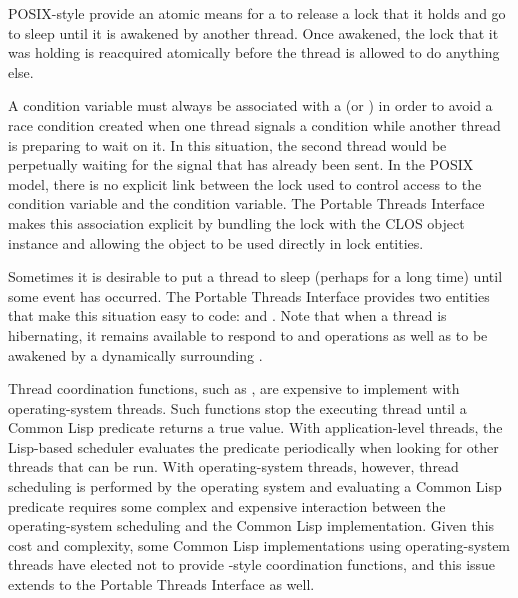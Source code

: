 
POSIX-style  provide an atomic means for a
 to release a lock that it holds and go to sleep until it is
awakened by another thread.  Once awakened, the lock that it was holding is
reacquired atomically before the thread is allowed to do anything else.

A condition variable must always be associated with a  (or
) in order to avoid a race condition created when one
thread signals a condition while another thread is preparing to wait on it.
In this situation, the second thread would be perpetually waiting for the
signal that has already been sent.  In the POSIX model, there is no explicit
link between the lock used to control access to the condition variable and the
condition variable.  The Portable Threads Interface makes this association
explicit by bundling the lock with the \textbf{}
CLOS object instance and allowing the \textbf{}
object to be used directly in lock entities.


Sometimes it is desirable to put a thread to sleep (perhaps for a long time)
until some event has occurred.  The Portable Threads Interface provides two
entities that make this situation easy to code:
\textbf{} and \textbf{}.
Note that when a thread is hibernating, it remains available to respond to
\textbf{} and \textbf{}
operations as well as to be awakened by a dynamically surrounding
\textbf{}.


Thread coordination functions, such as , are expensive to
implement with operating-system threads.  Such functions stop the executing
thread until a Common Lisp predicate  returns a true value.
With application-level threads, the Lisp-based scheduler evaluates the
predicate periodically when looking for other threads that can be run.  With
operating-system threads, however, thread scheduling is performed by the
operating system and evaluating a Common Lisp predicate 
requires some complex and expensive interaction between the operating-system
scheduling and the Common Lisp implementation.  Given this cost and
complexity, some Common Lisp implementations using operating-system threads
have elected not to provide -style coordination functions,
and this issue extends to the Portable Threads Interface as well.


